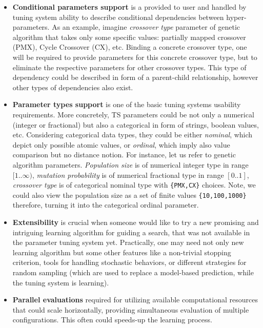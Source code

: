 \begin{itemize}
	\item \textbf{Conditional parameters support} is a provided to user and handled by tuning system ability to describe conditional dependencies between hyper-parameters. As an example, imagine \emph{crossover type} parameter of genetic algorithm that takes only some specific values: partially mapped crossover (PMX), Cycle Crossover (CX), etc. Binding a concrete crossover type, one will be required to provide parameters for this concrete crossover type, but to eliminate the respective parameters for other crossover types. This type of dependency could be described in form of a parent-child relationship, however other types of dependencies also exist.
	
	\item \textbf{Parameter types support} is one of the basic tuning systems usability requirements. More concretely, TS parameters could be not only a numerical (integer or fractional) but also a categorical in form of strings, boolean values, etc. Considering categorical data types, they could be either \emph{nominal}, which depict only possible atomic values, or \emph{ordinal}, which imply also value comparison but no distance notion. For instance, let us refer to genetic algorithm parameters. \emph{Population size} is of numerical integer type in range $[1..\infty)$, \emph{mutation probability} is of numerical fractional type in range $[0..1]$, \emph{crossover type} is of categorical nominal type with \texttt{\{PMX,CX\}} choices. Note, we could also view the population size as a set of finite values \texttt{\{10,100,1000\}} therefore, turning it into the categorical ordinal parameter.
	
	\item \textbf{Extensibility} is crucial when someone would like to try a new promising and intriguing learning algorithm for guiding a search, that was not available in the parameter tuning system yet. Practically, one may need not only new learning algorithm but some other features like a non-trivial stopping criterion, tools for handling stochastic behaviors, or different strategies for random sampling (which are used to replace a model-based prediction, while the tuning system is learning).
	
	\item \textbf{Parallel evaluations} required for utilizing available computational resources that could scale horizontally, providing simultaneous evaluation of multiple configurations. This often could speeds-up the learning process.
\end{itemize}


